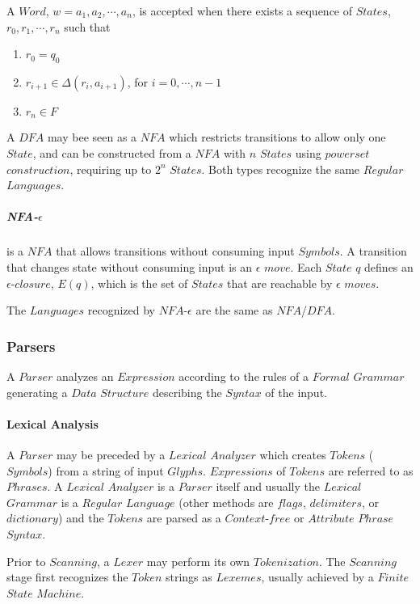 \documentclass{article}
\begin{document}
    A $Word$, $w=a_1,a_2,\cdots,a_n$, is accepted when there exists a
    sequence of $States$, $r_0,r_1,\cdots,r_n$ such that
    \begin{enumerate}
    \item $r_0 = q_0$
    \item $r_{i+1} \in \Delta(r_i, a_{i+1})$, for $i = 0, \cdots, n-1$
    \item $r_n \in F$
    \end{enumerate}

    A $DFA$ may bee seen as a $NFA$ which restricts transitions to
    allow only one $State$, and can be constructed from a $NFA$ with
    $n$ $States$ using $powerset$ $construction$, requiring up to
    $2^n$ $States$. Both types recognize the same $Regular$
    $Languages$.

    \subparagraph{NFA-$\epsilon$} is a $NFA$ that allows transitions
    without consuming input $Symbols$. A transition that changes state
    without consuming input is an $\epsilon$ $move$. Each $State$ $q$
    defines an $\epsilon$-$closure$, $E(q)$, which is the set of
    $States$ that are reachable by $\epsilon$ $moves$.

    The $Languages$ recognized by $NFA$-$\epsilon$ are the same as
    $NFA$/$DFA$.

\subsubsection{Parsers}

    A $Parser$ analyzes an $Expression$ according to the rules of a
    $Formal$ $Grammar$ generating a $Data$ $Structure$ describing the
    $Syntax$ of the input.

    \paragraph{Lexical Analysis}
    A $Parser$ may be preceded by a $Lexical$ $Analyzer$ which creates
    $Tokens$ ($Symbols$) from a string of input
    $Glyphs$. $Expressions$ of $Tokens$ are referred to as
    $Phrases$. A $Lexical$ $Analyzer$ is a $Parser$ itself and usually
    the $Lexical$ $Grammar$ is a $Regular$ $Language$ (other methods
    are $flags$, $delimiters$, or $dictionary$) and the $Tokens$ are
    parsed as a $Context$-$free$ or $Attribute$ $Phrase$ $Syntax$.

    Prior to $Scanning$, a $Lexer$ may perform its own $Tokenization$.
    The $Scanning$ stage first recognizes the $Token$ strings as
    $Lexemes$, usually achieved by a $Finite$ $State$ $Machine$.
\end{document}
